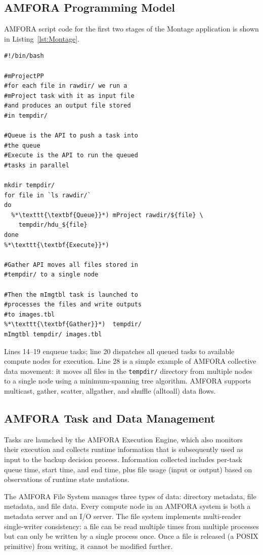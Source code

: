 \documentclass{sig-alternate}
\begin{document}
\subsection{AMFORA Programming Model}
AMFORA script code for the first two stages of the Montage application is shown in Listing~\ref{lst:Montage}.
\begin{lstlisting}[label=lst:Montage, caption=Parallel Script for Montage, xleftmargin=2.5ex]
#!/bin/bash

#mProjectPP
#for each file in rawdir/ we run a  
#mProject task with it as input file   
#and produces an output file stored  
#in tempdir/

#Queue is the API to push a task into 
#the queue
#Execute is the API to run the queued  
#tasks in parallel

mkdir tempdir/
for file in `ls rawdir/`
do
  %*\texttt{\textbf{Queue}}*) mProject rawdir/${file} \
    tempdir/hdu_${file}
done
%*\texttt{\textbf{Execute}}*) 

#Gather API moves all files stored in 
#tempdir/ to a single node

#Then the mImgtbl task is launched to
#processes the files and write outputs 
#to images.tbl
%*\texttt{\textbf{Gather}}*)  tempdir/
mImgtbl tempdir/ images.tbl 	    
\end{lstlisting}

Lines 14--19 enqueue tasks; line 20 dispatches all queued tasks  
to available compute nodes for execution. Line 28 is a simple example of AMFORA collective data movement:
it moves all files in the {\tt tempdir/} directory from multiple nodes to a single node using a minimum-spanning tree algorithm.
AMFORA supports multicast, gather, scatter, allgather, and shuffle (alltoall) data flows.

\subsection{AMFORA Task and Data Management}
Tasks are launched by the AMFORA Execution Engine, which also monitors their execution and collects runtime information
that is subsequently used as input to the backup decision process.
Information collected includes per-task queue time, start time, and end time, plus file usage (input or output) based on observations
of runtime state mutations.

The AMFORA File System manages three types of data: directory metadata, file metadata, and file data.
Every compute node in an AMFORA system is both a metadata server and an I/O server. 
The file system implements multi-reader single-writer consistency: a file can be read multiple times from multiple processes but can only be written by a single process once. Once a file is released (a POSIX primitive) from writing, it cannot be modified further. 
\end{document}
